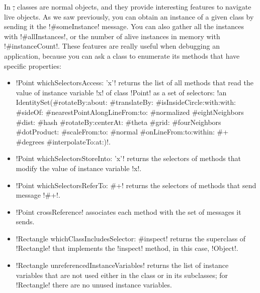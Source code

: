 \documentclass[a4paper,10pt,twoside]{book}
\begin{document}
In \st, classes are normal objects, and they provide interesting features to navigate live objects.
As we saw previously, you can obtain an instance of a given class by sending it the \ct!#someInstance! message.
You can also gather all the instances with \ct!#allInstances!, or the number of alive instances in memory with \ct!#instanceCount!.
These features are really useful when debugging an application, because you can ask a class to enumerate its methods that have specific properties:
\begin{itemize}
	\item \ct!Point whichSelectorsAccess: 'x'! returns the list of all methods that read the value of instance variable \ct!x! of class \ct!Point! as a set of selectors: \ct!an IdentitySet(#rotateBy:about: #translateBy: #isInsideCircle:with:with: #sideOf: #nearestPointAlongLineFrom:to: #normalized #eightNeighbors #dist: #hash #rotateBy:centerAt: #theta #grid: #fourNeighbors #dotProduct: #scaleFrom:to: #normal #onLineFrom:to:within: #+ #degrees #interpolateTo:at:)!.
	\item \ct!Point whichSelectorsStoreInto: 'x'! returns the selectors of methods that modify the value of instance variable \ct!x!.
	\item \ct!Point whichSelectorsReferTo: #+! returns the selectors of methods that send message \ct!#+!.
	\item \ct!Point crossReference! associates each method with the set of messages it sends.
	\item \ct!Rectangle whichClassIncludesSelector: #inspect! returns the superclass of \ct!Rectangle! that implements the \ct!inspect! method, in this case, \ct!Object!.
	\item \ct!Rectangle unreferencedInstanceVariables! returns the list of instance variables that are not used either in the class or in its subclasses; for \ct!Rectangle! there are no unused instance variables.
\end{itemize}
\end{document}

